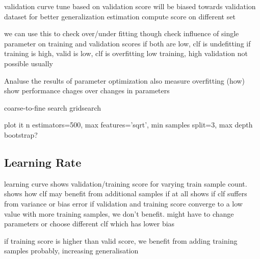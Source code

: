 validation curve
tune based on validation score
will be biased towards validation dataset
for better generalization estimation compute score on different set

we can use this to check over/under fitting though
check influence of single parameter on training and validation scores
if both are low, clf is undefitting
if training is high, valid is low, clf is overfitting
low training, high validation not possible usually

Analuse the results of parameter optimization
also measure overfitting (how)
show performance chages over changes in parameters

coarse-to-fine search gridsearch

plot it
            n estimators=500,
            max features='sqrt',
            min samples split=3,
            max depth
            bootstrap?

\subsection{Learning Rate}
learning curve
shows validation/training score for varying train sample count.
shows how clf may benefit from additional samples if at all
shows if clf suffers from variance or bias error
if validation and training score converge to a low value with more training samples,
we don't benefit. might have to change parameters or choose different clf which
has lower bias

if training score is higher than valid score, we benefit from adding training
samples probably, increasing generalisation


